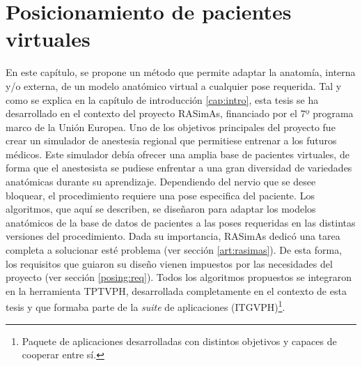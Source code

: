 \chapter{Posicionamiento de pacientes virtuales} 
\label{cap:posing}


En este capítulo, se propone un método que permite adaptar la anatomía, interna y/o externa, de un modelo anatómico virtual a cualquier pose requerida. Tal y como se explica en la capítulo de introducción \ref{cap:intro}, esta tesis se ha desarrollado en el contexto del proyecto \ac{RASimAs}, financiado por el 7º programa marco de la Unión Europea. Uno de los objetivos principales del proyecto fue crear un simulador de anestesia regional que permitiese entrenar a los futuros médicos. 
Este simulador debía ofrecer una amplia base de pacientes virtuales, de forma que el anestesista se pudiese enfrentar a una gran diversidad de variedades anatómicas durante su aprendizaje. Dependiendo del nervio que se desee bloquear, el procedimiento requiere una pose especifica del paciente. Los algoritmos, que aquí se describen, se diseñaron para adaptar los modelos anatómicos de la base de datos de pacientes a las poses requeridas en las distintas versiones del procedimiento. Dada su importancia, \ac{RASimAs} dedicó una tarea completa a solucionar esté problema (ver sección \ref{art:rasimas}). 
De esta forma, los requisitos que guiaron su diseño vienen impuestos por las necesidades del proyecto (ver sección \ref{posing:req}). Todos los algoritmos propuestos se integraron en la herramienta \ac{TPTVPH}, desarrollada completamente en el contexto de esta tesis y que formaba parte de la \emph{suite} de aplicaciones (\ac{ITGVPH})\footnote{Paquete de aplicaciones desarrolladas con distintos objetivos y capaces de cooperar entre sí.}.



